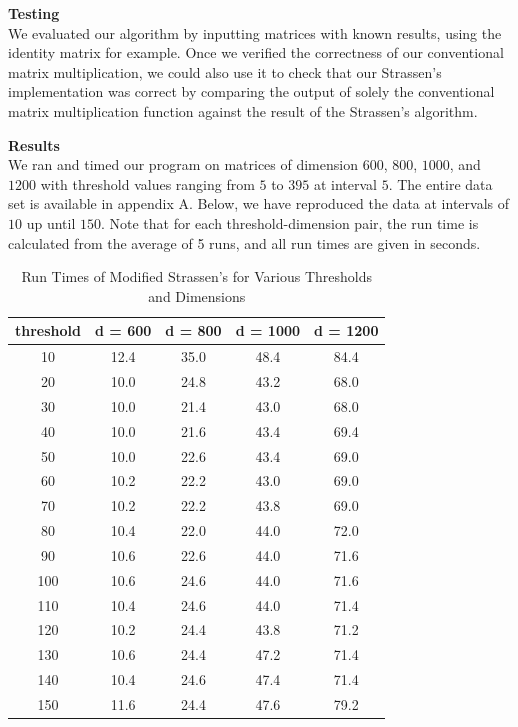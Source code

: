 \documentclass[12pt]{article}
\begin{document}
\bigskip

\textbf{Testing} \\
We evaluated our algorithm by inputting matrices with known results, using the identity matrix for example. Once we verified the correctness of our conventional matrix multiplication, we could also use it to check that our Strassen's implementation was correct by comparing the output of solely the conventional matrix multiplication function against the result of the Strassen's algorithm.

\pagebreak

\textbf{Results} \\
We ran and timed our program on matrices of dimension $600$, $800$, $1000$, and $1200$ with threshold values ranging from $5$ to $395$ at interval $5$. The entire data set is available in appendix A. Below, we have reproduced the data at intervals of $10$ up until $150$. Note that for each threshold-dimension pair, the run time is calculated from the average of 5 runs, and all run times are given in seconds.

\begin{table}[h]
\centering
{\setlength{\tabcolsep}{15pt}
\begin{tabular}{c|c|c|c|c}
threshold & d = 600 & d = 800 & d = 1000 & d = 1200 \\\hline
10 & 12.4 & 35.0 & 48.4 & 84.4 \\
20 & 10.0 & 24.8 & 43.2 & 68.0 \\
30 & 10.0 & 21.4 & 43.0 & 68.0 \\
40 & 10.0 & 21.6 & 43.4 & 69.4 \\
50 & 10.0 & 22.6 & 43.4 & 69.0 \\
60 & 10.2 & 22.2 & 43.0 & 69.0 \\
70 & 10.2 & 22.2 & 43.8 & 69.0 \\
80 & 10.4 & 22.0 & 44.0 & 72.0 \\
90 & 10.6 & 22.6 & 44.0 & 71.6 \\
100 & 10.6 & 24.6 & 44.0 & 71.6 \\
110 & 10.4 & 24.6 & 44.0 & 71.4 \\
120 & 10.2 & 24.4 & 43.8 & 71.2 \\
130 & 10.6 & 24.4 & 47.2 & 71.4 \\
140 & 10.4 & 24.6 & 47.4 & 71.4 \\
150 & 11.6 & 24.4 & 47.6 & 79.2 \\
\end{tabular}}
\caption{Run Times of Modified Strassen's for Various Thresholds and Dimensions}
\end{table}
\end{document}
